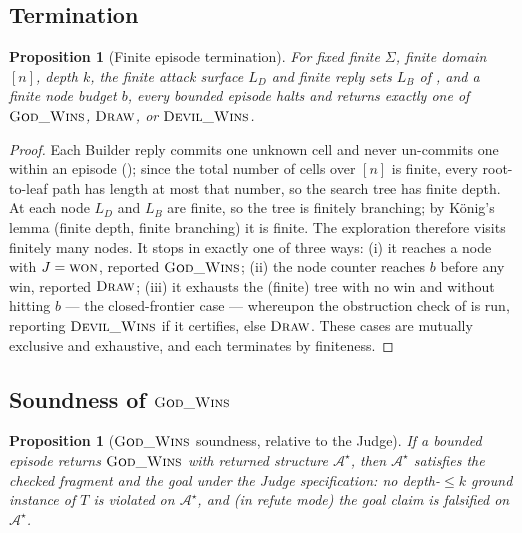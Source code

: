 \documentclass[11pt]{article}
\theoremstyle{definition}
\theoremstyle{plain}
\newtheorem{proposition}[definition]{Proposition}
\newcommand{\Sig}{\Sigma}
\newcommand{\Thy}{T}
\newcommand{\Struct}{\mathcal{A}}
\begin{document}
\subsection{Termination}

\begin{proposition}[Finite episode termination]\label{prop:termination}
For fixed finite $\Sig$, finite domain $[n]$, depth $k$, the finite attack surface $L_D$ and finite
reply sets $L_B$ of , and a finite node budget $b$, every bounded episode halts and
returns exactly one of $\textsc{God\_Wins}$, $\textsc{Draw}$, or $\textsc{Devil\_Wins}$.
\end{proposition}

\begin{proof}
Each Builder reply commits one unknown cell and never un-commits one within an episode
(); since the total number of cells over $[n]$ is finite, every root-to-leaf path
has length at most that number, so the search tree has finite depth. At each node $L_D$ and $L_B$ are
finite, so the tree is finitely branching; by König's lemma (finite depth, finite branching) it is
finite. The exploration therefore visits finitely many nodes. It stops in exactly one of three ways:
(i) it reaches a node with $J=\textsc{won}$, reported $\textsc{God\_Wins}$; (ii) the node counter
reaches $b$ before any win, reported $\textsc{Draw}$; (iii) it exhausts the (finite) tree with no win
and without hitting $b$ --- the closed-frontier case --- whereupon the obstruction check of
 is run, reporting $\textsc{Devil\_Wins}$ if it certifies, else $\textsc{Draw}$.
These cases are mutually exclusive and exhaustive, and each terminates by finiteness.
\end{proof}

\subsection{Soundness of $\textsc{God\_Wins}$}

\begin{proposition}[$\textsc{God\_Wins}$ soundness, relative to the Judge]\label{prop:godsound}
If a bounded episode returns $\textsc{God\_Wins}$ with returned structure $\Struct^\star$, then
$\Struct^\star$ satisfies the checked fragment and the goal under the Judge specification: no depth-$\le k$
ground instance of $\Thy$ is violated on $\Struct^\star$, and (in refute mode) the goal claim is falsified
on $\Struct^\star$.
\end{proposition}
\end{document}
